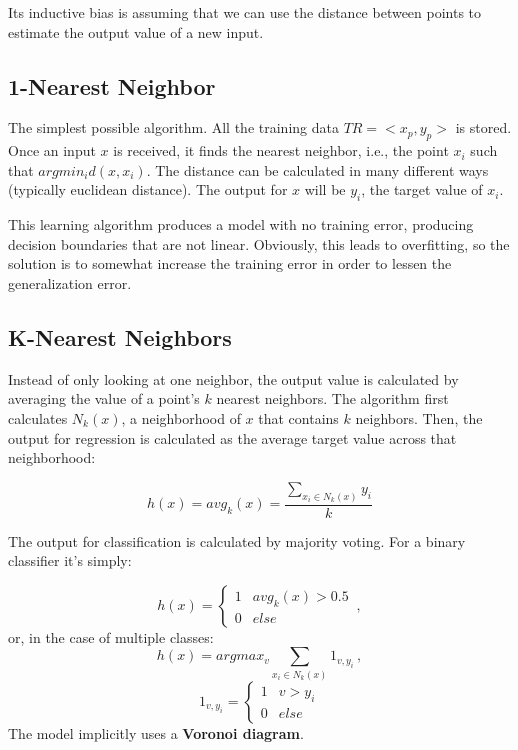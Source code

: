 Its inductive bias is assuming that we can use the distance between points to estimate the output value of a new input.

\subsection{1-Nearest Neighbor}

The simplest possible algorithm. All the training data $TR = <x_p, y_p>$ is stored. Once an input $x$ is received, it finds the nearest neighbor, i.e., the point $x_i$ such that $argmin_i d(x, x_i)$. The distance can be calculated in many different ways (typically euclidean distance). The output for $x$ will be $y_i$, the target value of $x_i$.

This learning algorithm produces a model with no training error, producing decision boundaries that are not linear. Obviously, this leads to overfitting, so the solution is to somewhat increase the training error in order to lessen the generalization error.

\subsection{K-Nearest Neighbors}

Instead of only looking at one neighbor, the output value is calculated by averaging the value of a point's $k$ nearest neighbors. The algorithm first calculates $N_k(x)$, a neighborhood of $x$ that contains $k$ neighbors. Then, the output for regression is calculated as the average target value across that neighborhood:

\begin{equation*}
    h(x) = avg_k(x) = \frac{\sum_{x_i \in N_k(x)} y_i}{k}
\end{equation*}

The output for classification is calculated by majority voting. For a binary classifier it's simply:

\begin{equation*}
    h(x) = \begin{cases}
        1 & avg_k(x) > 0.5 \\
        0 & else
    \end{cases} \, ,
\end{equation*}
or, in the case of multiple classes:
\begin{equation*}
    h(x) = argmax_v \sum_{x_i \in N_k(x)} 1_{v,y_i} \, ,
\end{equation*}
\begin{equation*}
    1_{v,y_i} = \begin{cases}
        1 & v > y_i \\
        0 & else
    \end{cases}
\end{equation*}
The model implicitly uses a \textbf{Voronoi diagram}.

